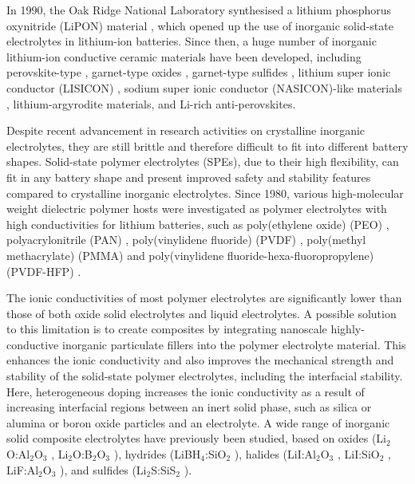 \documentclass[../main.tex]{subfiles}
\begin{document}
In 1990, the Oak Ridge National Laboratory synthesised a lithium phosphorus oxynitride (LiPON) material \cite{dudney1992,bates1992}, which opened up the use of inorganic solid-state electrolytes in lithium-ion batteries. Since then, a huge number of inorganic lithium-ion conductive ceramic materials have been developed, including perovskite-type \cite{inaguma1993}, garnet-type oxides \cite{kasper1969,mazza1988}, garnet-type sulfides \cite{kennedy1986}, lithium super ionic conductor (LISICON) \cite{ivanov1988}, sodium super ionic conductor (NASICON)-like materials \cite{lang2015}, lithium-argyrodite materials, \cite{deklerk2016} and Li-rich anti-perovskites. \cite{dawson2018elucidating,ahiavi2020mechanochemical}

Despite recent advancement in research activities on crystalline inorganic electrolytes, they are still brittle and therefore difficult to fit into different battery shapes. Solid-state polymer electrolytes (SPEs), due to their high flexibility, can fit in any battery shape and present improved safety and stability features compared to crystalline inorganic electrolytes. \cite{DIRICAN201927} Since 1980, various high-molecular weight dielectric polymer hosts were investigated as polymer electrolytes with high conductivities for lithium batteries, such as poly(ethylene oxide) (PEO) \cite{fenton1973}, polyacrylonitrile (PAN) \cite{abraham1990,dautzenberg1994}, poly(vinylidene fluoride) (PVDF) \cite{arcella1999,kataoka2000,li2016}, poly(methyl methacrylate) (PMMA) \cite{appetecchi1995,bohnke1993} and poly(vinylidene fluoride-hexa-fluoropropylene) (PVDF-HFP) \cite{abbrent2001,park2008,yang2014}.

The ionic conductivities of most polymer electrolytes are significantly lower than those of both oxide solid electrolytes and liquid electrolytes. \cite{zhou2016} A possible solution to this limitation is to create composites by integrating nanoscale highly-conductive inorganic particulate fillers into the polymer electrolyte material. \cite{DIRICAN201927} This enhances the ionic conductivity and also improves the mechanical strength and stability of the solid-state polymer electrolytes, including the interfacial stability. \cite{D0SC03121F} Here, heterogeneous doping increases the ionic conductivity as a result of increasing interfacial regions between an inert solid phase, such as silica or alumina or boron oxide particles and an electrolyte. \cite{uvarov2011} A wide range of inorganic solid composite electrolytes have previously been studied, based on oxides (Li$_{2}$O:Al$_{2}$O$_{3}$ \cite{B300908D}, Li$_{2}$O:B$_{2}$O$_{3}$ \cite{Heitjans_2003,Indris2000,Indris2002}), hydrides (LiBH$_{4}$:SiO$_{2}$ \cite{blanchard2015}), halides (LiI:Al$_{2}$O$_{3}$ \cite{liang1973}, LiI:SiO$_{2}$ \cite{phipps1983}, LiF:Al$_{2}$O$_{3}$ \cite{uvarov1992}), and sulfides (Li$_{2}$S:SiS$_{2}$ \cite{pradel1986}). 
\end{document}
